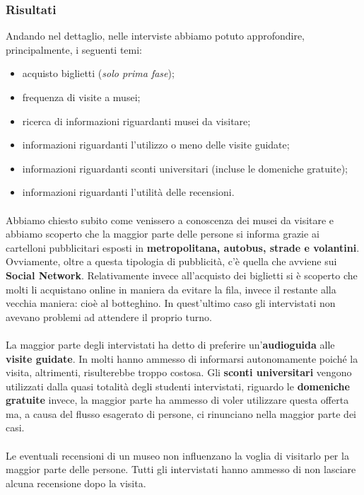 \subsubsection{Risultati}
Andando nel dettaglio, nelle interviste abbiamo potuto approfondire, principalmente, i seguenti temi:
    \begin{itemize}
      \item acquisto biglietti (\textit{solo prima fase});
        \item frequenza di visite a musei;
        \item ricerca di informazioni riguardanti musei da visitare;
        \item informazioni riguardanti l'utilizzo o meno delle visite guidate;
        \item informazioni riguardanti sconti universitari (incluse le domeniche gratuite);
        \item informazioni riguardanti l'utilità delle recensioni.
    \end{itemize}
    
\paragraph{}    
Abbiamo chiesto subito come venissero a conoscenza dei musei da visitare e abbiamo scoperto che la maggior parte delle persone si informa grazie ai cartelloni pubblicitari esposti in \textbf{metropolitana, autobus, strade e volantini}. Ovviamente, oltre a questa tipologia di pubblicità, c'è quella che avviene sui \textbf{Social Network}. Relativamente invece all'acquisto dei biglietti si è scoperto che molti li acquistano online in maniera da evitare la fila, invece il restante alla vecchia maniera: cioè al botteghino. In quest'ultimo caso gli intervistati non avevano problemi ad attendere il proprio turno.

\paragraph{}
La maggior parte degli intervistati ha detto di preferire un'\textbf{audioguida} alle \textbf{visite guidate}. In molti hanno ammesso di informarsi autonomamente poiché la visita, altrimenti, risulterebbe troppo costosa.
\newline
Gli \textbf{sconti universitari} vengono utilizzati dalla quasi totalità degli studenti intervistati, riguardo le \textbf{domeniche gratuite} invece, la maggior parte ha ammesso di voler utilizzare questa offerta ma, a causa del flusso esagerato di persone, ci rinunciano nella maggior parte dei casi.

\paragraph{}
Le eventuali recensioni di un museo non influenzano la voglia di visitarlo per la maggior parte delle persone. Tutti gli intervistati hanno ammesso di non lasciare alcuna recensione dopo la visita.